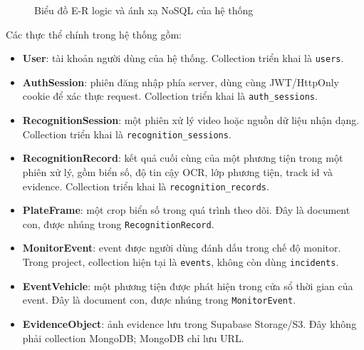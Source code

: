 \documentclass[../DoAn.tex]{subfiles}
\begin{document}
\begin{figure}[H]
{%
    }
    \caption{Biểu đồ E-R logic và ánh xạ NoSQL của hệ thống}
    \label{fig:database-er}
\end{figure}

Các thực thể chính trong hệ thống gồm:

\begin{itemize}
    \item \textbf{User}: tài khoản người dùng của hệ thống. Collection triển khai là \texttt{users}.
    \item \textbf{AuthSession}: phiên đăng nhập phía server, dùng cùng JWT/HttpOnly cookie để xác thực request. Collection triển khai là \texttt{auth\_sessions}.
    \item \textbf{RecognitionSession}: một phiên xử lý video hoặc nguồn dữ liệu nhận dạng. Collection triển khai là \texttt{recognition\_sessions}.
    \item \textbf{RecognitionRecord}: kết quả cuối cùng của một phương tiện trong một phiên xử lý, gồm biển số, độ tin cậy OCR, lớp phương tiện, track id và evidence. Collection triển khai là \texttt{recognition\_records}.
    \item \textbf{PlateFrame}: một crop biển số trong quá trình theo dõi. Đây là document con, được nhúng trong \texttt{RecognitionRecord}.
    \item \textbf{MonitorEvent}: event được người dùng đánh dấu trong chế độ monitor. Trong project, collection hiện tại là \texttt{events}, không còn dùng \texttt{incidents}.
    \item \textbf{EventVehicle}: một phương tiện được phát hiện trong cửa sổ thời gian của event. Đây là document con, được nhúng trong \texttt{MonitorEvent}.
    \item \textbf{EvidenceObject}: ảnh evidence lưu trong Supabase Storage/S3. Đây không phải collection MongoDB; MongoDB chỉ lưu URL.
\end{itemize}
\end{document}
